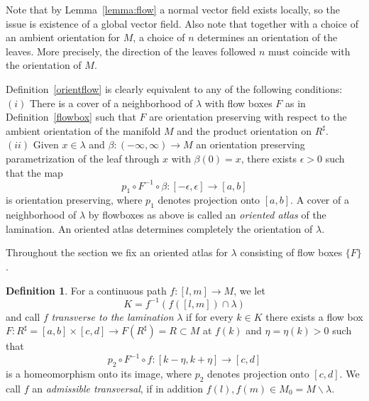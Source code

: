 \documentclass{ip-journal}
\theoremstyle{definition}
\newtheorem{definition}[theorem]{Definition}
\numberwithin{equation}{section}
\begin{document}
 
 Note that by Lemma~\ref{lemma:flow}  a normal vector field exists locally, so the issue is existence of a global vector field. Also note that together with a choice of an ambient orientation for $M$, a choice of $n$ determines an orientation of the leaves. More precisely, the direction of the leaves followed $n$ must coincide with the orientation of $M$.
 
 Definition~\ref{orientflow} is clearly equivalent to any of the following conditions:\\
  $(i)$ There is a cover of a neighborhood of $\lambda$ with flow boxes $F$ as in Definition~\ref{flowbox} such that $F$ are orientation preserving
 with respect to  the ambient orientation of the manifold $M$ and the product orientation on $R^\sharp$. \\
 $(ii)$ Given $x \in \lambda$ and $\beta: (-\infty, \infty) \rightarrow M$ an orientation preserving parametrization of the leaf through $x$ with $\beta(0)=x$, there exists $\epsilon >0$ such that the map
 \begin{equation}\label{p1}
p_1\circ F^{-1}\circ  \beta: [-\epsilon, \epsilon] \rightarrow [a,b]
\end{equation}
 is orientation preserving, where $p_1$ denotes projection onto $[a,b]$.
 A cover of a neighborhood of $\lambda$ by flowboxes as above is called an {\it{oriented atlas}} of the lamination. An oriented atlas determines completely the orientation of $\lambda$. 

 
 Throughout the section we fix an oriented atlas for $\lambda$ consisting of flow boxes $\{F\}$.
  

\begin{definition}\label{MDefinition5A}
For a continuous path $f: [l, m] \rightarrow M$, we let
\begin{equation}\label{defK}
K=f^{-1}\left(f([l, m]) \cap \lambda \right)
\end{equation}
and call $f$  {\it{transverse to the lamination}} $\lambda$ if for every $k \in K$ there exists a flow box 
$F: R^\sharp=[a,b] \times [c,d]  \rightarrow  F(R^\sharp) =R\subset M $
at $f(k)$ and $\eta=\eta(k)>0$ such that 
\begin{equation}\label{p2}
 p_2 \circ F^{-1} \circ f: [k-\eta, k+\eta] \rightarrow [c,d]
\end{equation}
is a homeomorphism onto its image, where $p_2$ denotes projection onto $[c,d]$.
We call $f$  an {\it{admissible transversal}}, if in addition $f(l), f(m)\in M_0=M \backslash \lambda$.
\end{definition}
\end{document}
